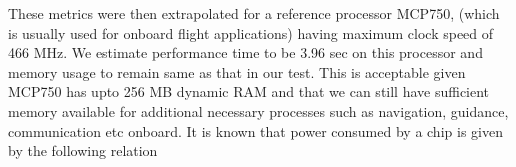 These metrics were then extrapolated for a reference processor MCP750, (which is usually used for onboard flight applications)  having maximum clock speed of 466 MHz. We estimate performance time to be 3.96 sec on this processor and memory usage to remain same as that in our test.  This is acceptable given MCP750 has upto 256 MB dynamic RAM and that we can still have sufficient memory available for additional necessary processes such as navigation, guidance, communication etc onboard. It is known that power consumed by a chip is given by the following relation

